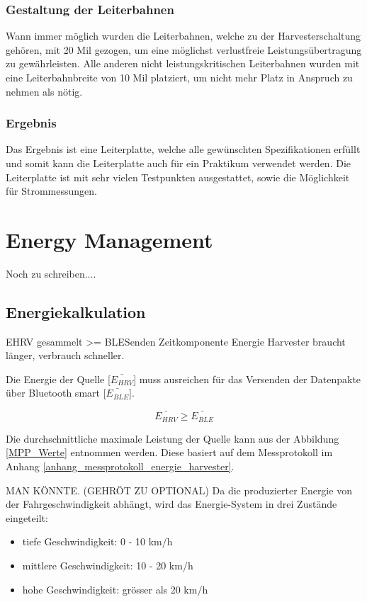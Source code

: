 \subsubsection{Gestaltung der Leiterbahnen}

Wann immer möglich wurden die Leiterbahnen, welche zu der Harvesterschaltung gehören, mit 20 Mil gezogen, um eine möglichst verlustfreie Leistungsübertragung zu gewährleisten. Alle anderen nicht leistungskritischen Leiterbahnen wurden mit eine Leiterbahnbreite von 10 Mil platziert, um nicht mehr Platz in Anspruch zu nehmen als nötig.

\subsubsection{Ergebnis}

Das Ergebnis ist eine Leiterplatte, welche alle gewünschten Spezifikationen erfüllt und somit kann die Leiterplatte auch für ein Praktikum verwendet werden. Die Leiterplatte ist mit sehr vielen Testpunkten ausgestattet, sowie die Möglichkeit für Strommessungen.


\section{Energy Management}

Noch zu schreiben....

\subsection{Energiekalkulation}
EHRV gesammelt >= BLESenden
Zeitkomponente
Energie Harvester braucht länger, verbrauch schneller.

Die Energie der Quelle [$\bar{E_{HRV}} $] muss ausreichen für das Versenden der Datenpakte über Bluetooth smart [$\bar{E_{BLE}}$].

\[\bar{E_{HRV}} \ge \bar{E_{BLE}}  \]


Die durchschnittliche maximale Leistung der Quelle kann aus der Abbildung \ref{MPP_Werte} entnommen werden. Diese basiert auf dem Messprotokoll im Anhang \ref{anhang_messprotokoll_energie_harvester}. 

MAN KÖNNTE. (GEHRÖT ZU OPTIONAL) Da die produzierter Energie von der Fahrgeschwindigkeit abhängt, wird das Energie-System in drei Zustände eingeteilt:

\begin{itemize}
    \item tiefe Geschwindigkeit: 0 - 10 km/h
    \item mittlere Geschwindigkeit: 10 - 20 km/h 
    \item hohe Geschwindigkeit: grösser als 20 km/h 
\end{itemize}

